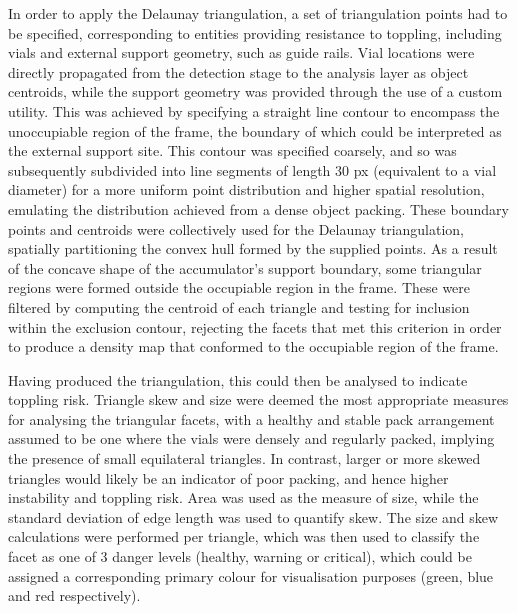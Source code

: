 \documentclass[10pt]{article}
\begin{document}
In order to apply the Delaunay triangulation, a set of triangulation points had to be specified, corresponding to entities providing resistance to toppling, including vials and external support geometry, such as guide rails. Vial locations were directly propagated from the detection stage to the analysis layer as object centroids, while the support geometry was provided through the use of a custom utility. This was achieved by specifying a straight line contour to encompass the unoccupiable region of the frame, the boundary of which could be interpreted as the external support site. This contour was specified coarsely, and so was subsequently subdivided into line segments of length 30 px (equivalent to a vial diameter) for a more uniform point distribution and higher spatial resolution, emulating the distribution achieved from a dense object packing. These boundary points and centroids were collectively used for the Delaunay triangulation, spatially partitioning the convex hull formed by the supplied points. As a result of the concave shape of the accumulator's support boundary, some triangular regions were formed outside the occupiable region in the frame. These were filtered by computing the centroid of each triangle and testing for inclusion within the exclusion contour, rejecting the facets that met this criterion in order to produce a density map that conformed to the occupiable region of the frame.

Having produced the triangulation, this could then be analysed to indicate toppling risk. Triangle skew and size were deemed the most appropriate measures for analysing the triangular facets, with a healthy and stable pack arrangement assumed to be one where the vials were densely and regularly packed, implying the presence of small equilateral triangles. In contrast, larger or more skewed triangles would likely be an indicator of poor packing, and hence higher instability and toppling risk. Area was used as the measure of size, while the standard deviation of edge length was used to quantify skew. The size and skew calculations were performed per triangle, which was then used to classify the facet as one of 3 danger levels (healthy, warning or critical), which could be assigned a corresponding primary colour for visualisation purposes (green, blue and red respectively). 
\end{document}
